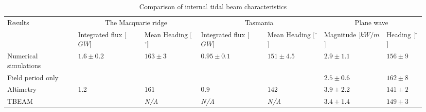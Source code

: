 \documentclass[12pt]{article}
\begin{document}
\begin{table}
	\caption{Comparison of internal tidal beam characteristics}
	\begin{tabular}{ |p{4cm}||p{1.75cm}|p{1.75cm}||p{1.75cm}|p{1.75cm}||p{1.75cm}|p{1.75cm}| }
		\toprule
		\multirow{2}{*}[-3pt]{Results} & \multicolumn{2}{c}{The Macquarie ridge} & 		
		\multicolumn{2}{c}{Tasmania} & \multicolumn{2}{c}{Plane wave}\\

		\cmidrule{2-7}
		 & \scriptsize{Integrated flux [$GW$]} & \scriptsize{Mean Heading [$^\circ$]}  & 
		 \scriptsize{Integrated flux [$GW$]} &  \scriptsize{Mean Heading [$^\circ$]} & 
		 \scriptsize{Magnitude [$kW/m$]} & \scriptsize{Heading [$^\circ$]}\\
		\midrule
		Numerical simulations & $1.6 \pm 0.2$ & $163 \pm 3$ & $0.95 \pm 0.1$ & $151 \pm 4.5$ & 
		$2.9 \pm 1.1$ & $156 \pm 9$ \\
		Field period only & & & & & $2.5 \pm 0.6$ & $162 \pm 8$ \\ 
		Altimetry &  $1.2$ & $161$ & $0.9$ & $142$ & $3.9 \pm 2.2$ & $141 \pm 2$ \\
		TBEAM &   \textit{~} & \textit{N/A} & \textit{N/A} & \textit{N/A} & $3.4 \pm 1.4$ & $149 
		\pm 3$ \\
		\bottomrule
	\end{tabular}
	\label{C3:tab.prms}
\end{table}
\end{document}
